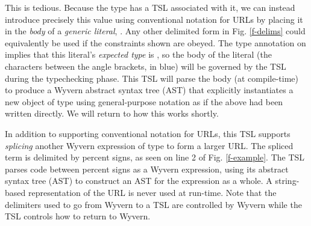This is tedious. Because the  type has a TSL associated with it, we can instead introduce precisely this value using conventional notation for URLs by placing it in the \emph{body} of a \emph{generic literal}, . Any other delimited form in Fig. \ref{f-delims} could equivalently be used if the constraints shown are obeyed. The type annotation on  implies that this literal's \emph{expected type} is , so the {body} of the literal (the characters between the angle brackets, in blue) will be governed by the  TSL during the typechecking phase. This TSL will parse the body ({at compile-time}) to produce a Wyvern abstract syntax tree (AST) that explicitly instantiates a new object of type  using general-purpose notation as if the above had been written directly. We will return to how this works shortly. 

In addition to supporting conventional notation for URLs, this TSL supports \emph{splicing}
another Wyvern expression of type  to form a larger URL. The spliced term is delimited by percent signs,
as seen on line 2 of Fig. \ref{f-example}. The TSL parses code between percent signs  as a Wyvern expression, using its abstract syntax tree (AST) to construct an AST for the expression as a whole. A string-based representation of the URL is never used at run-time. Note that the delimiters used to go from Wyvern to a TSL are controlled by Wyvern  while the TSL controls how to return to Wyvern. 
